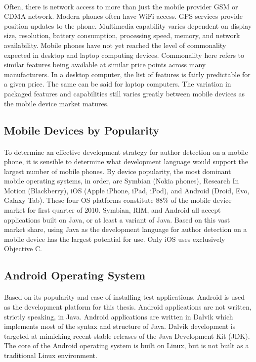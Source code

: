 	\paragraph{}Often, there is network access to more than just the mobile provider GSM or CDMA network.  Modern phones often have WiFi access.  GPS services provide position updates to the phone.  Multimedia capability varies dependent on display size, resolution, battery consumption, processing speed, memory, and network availability.  Mobile phones have not yet reached the level of commonality expected in desktop and laptop computing devices.  Commonality here refers to similar features being available at similar price points across many manufacturers.  In a desktop computer, the list of features is fairly predictable for a given price.  The same can be said for laptop computers.  The variation in packaged features and capabilities still varies greatly between mobile devices as the mobile device market matures.

	\subsection{Mobile Devices by Popularity} 
		\paragraph{}To determine an effective development strategy for author detection on a mobile phone, it is sensible to determine what development language would support the largest number of mobile phones.  By device popularity, the most dominant mobile operating systems, in order,  are Symbian (Nokia phones), Research In Motion (Blackberry), iOS (Apple iPhone, iPad, iPod), and Android (Droid, Evo, Galaxy Tab).  These four OS platforms constitute 88\% of the mobile device market for first quarter of 2010.\cite{_gartner_????}  Symbian, RIM, and Android all accept applications built on Java, or at least a variant of Java. Based on this vast market share, using Java as the development language for author detection on a mobile device has the largest potential for use.\cite{_blackberry_????}\cite{_symbian_????}\cite{murphy_android_2010}  Only iOS uses exclusively Objective C.\cite{_creating_????}  

	\subsection{Android Operating System}
		\paragraph{} Based on its popularity and ease of installing test applications, Android is used as the development platform for this thesis.  Android applications are not written, strictly speaking, in Java.  Android applications are written in Dalvik which implements most of the syntax and structure of Java.  Dalvik development is targeted at mimicking recent stable releases of the Java Development Kit (JDK). The core of the Android operating system is built on Linux, but is not built as a traditional Linux environment.\cite{murphy_android_2010}
		
